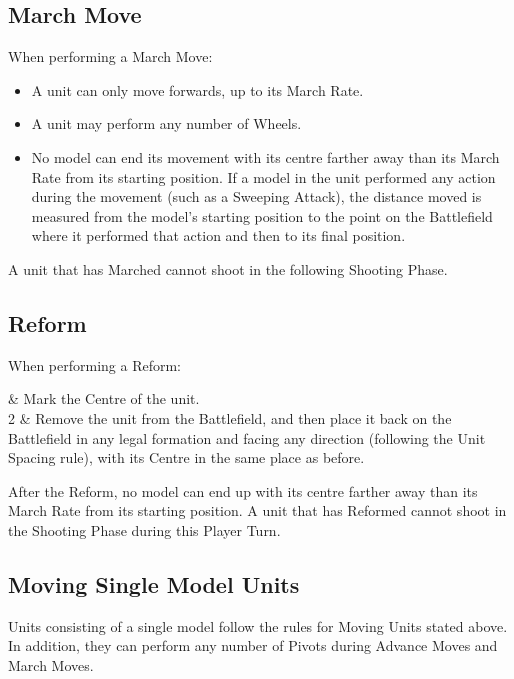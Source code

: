 \subsection{March Move}
\label{march_move}

When performing a March Move:

\begin{itemize}
\item A unit can only move forwards, up to its March Rate.
\item A unit may perform any number of Wheels.
\item No model can end its movement with its centre farther away than its March Rate from its starting position. If a model in the unit performed any action during the movement (such as a Sweeping Attack), the distance moved is measured from the model's starting position to the point on the Battlefield where it performed that action and then to its final position.
\end{itemize}

A unit that has Marched cannot shoot in the following Shooting Phase.

\columnbreak

\subsection{Reform}
\label{reform}

When performing a Reform:

 & Mark the Centre of the unit.\\
2 & Remove the unit from the Battlefield, and then place it back on the Battlefield in any legal formation and facing any direction (following the Unit Spacing rule), with its Centre in the same place as before.\\
\closeseqtablemc

After the Reform, no model can end up with its centre farther away than its March Rate from its starting position. A unit that has Reformed cannot shoot in the Shooting Phase during this Player Turn.

\subsection{Moving Single Model Units}
\label{moving_single_model_units}

Units consisting of a single model follow the rules for Moving Units stated above. In addition, they can perform any number of Pivots during Advance Moves and March Moves.

